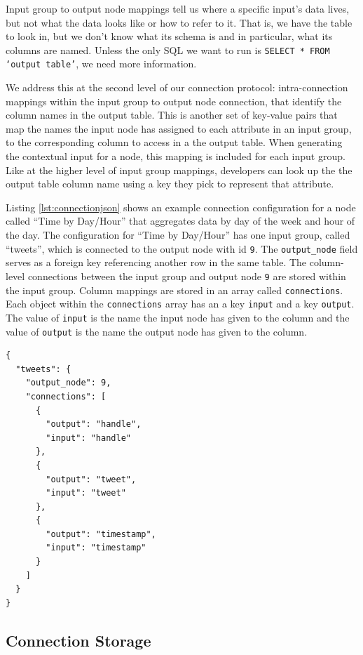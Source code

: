 \documentclass[midd]{thesis}
\begin{document}
Input group to output node mappings tell us where a specific input's data lives,
but not what the data looks like or how to refer to it. That is, we have the
table to look in, but we don't know what its schema is and in particular, what
its columns are named. Unless the only SQL we want to run is \texttt{SELECT *
FROM `output table'}, we need more information.

We address this at the second level of our connection protocol: intra-connection
mappings within the input group to output node connection, that identify the
column names in the output table. This is another set of key-value pairs that
map the names the input node has assigned to each attribute in an input group,
to the corresponding column to access in a the output table. When generating the
contextual input for a node, this mapping is included for each input group. Like
at the higher level of input group mappings, developers can look up the the
output table column name using a key they pick to represent that attribute.

Listing \ref{lst:connectionjson} shows an example connection configuration for a
node called ``Time by Day/Hour'' that aggregates data by day of the week and
hour of the day. The configuration for ``Time by Day/Hour'' has one input group,
called ``tweets'', which is connected to the output node with id \texttt{9}. The
\texttt{output\_node} field serves as a foreign key referencing another row in
the same table. The column-level connections between the input group and output
node \texttt{9} are stored within the input group. Column mappings are stored in
an array called \texttt{connections}. Each object within the
\texttt{connections} array has an a key \texttt{input} and a key
\texttt{output}. The value of \texttt{input} is the name the input node has
given to the column and the value of \texttt{output} is the name the output node
has given to the column.

\begin{lstlisting}[caption={A node's connection configuration. The node has a connection from its input group ``tweets'' to the node with id 9.}, captionpos=b, label={lst:connectionjson}]
{
  "tweets": {
    "output_node": 9,
    "connections": [
      {
        "output": "handle",
        "input": "handle"
      },
      {
        "output": "tweet",
        "input": "tweet"
      },
      {
        "output": "timestamp",
        "input": "timestamp"
      }
    ]
  }
}
\end{lstlisting}

\subsection{Connection Storage}
\end{document}
